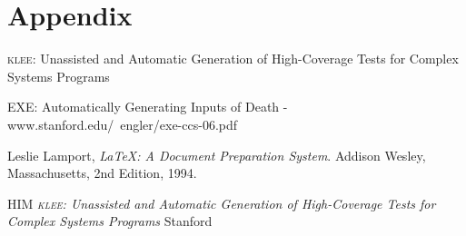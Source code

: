 \documentclass[12pt,a4paper]{article}
\begin{document}
\section{Appendix}
\textsc{klee}: Unassisted and Automatic Generation of High-Coverage Tests for Complex Systems Programs

%
%
EXE: Automatically Generating Inputs of Death - www.stanford.edu/~engler/exe-ccs-06.pdf

\begin{thebibliography}{9}

         Leslie Lamport,
          \emph{\LaTeX: A Document Preparation System}.
	  Addison Wesley, Massachusetts,
	  2nd Edition,
	  1994.

         HIM
         \emph{\textsc{klee}: Unassisted and Automatic Generation of High-Coverage Tests for Complex Systems Programs}
         Stanford
\end{thebibliography}
\end{document}
